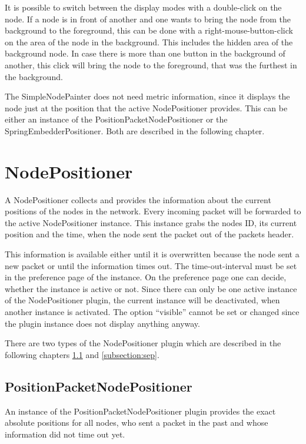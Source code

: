 It is possible to switch between the display modes with a double-click on the node. If a node is in front of another and one
wants to bring the node from the background to the foreground, this can be done with a right-mouse-button-click on
the area of the node in the background. This includes the hidden area of the background node.
In case there is more than one button in the background of another, this click will
bring the node to the foreground, that was the furthest in the background.

The SimpleNodePainter does not need metric information, since it displays the node just at the position that the active
NodePositioner provides. This can be either an instance of the PositionPacketNodePositioner or the SpringEmbedderPositioner.
Both are described in the following chapter.

\newpage
\section{NodePositioner}

A NodePositioner collects and provides the information about the current positions of the nodes in the network. Every incoming
packet will be forwarded to the active NodePositioner instance. This instance grabs the nodes ID, its current position and
the time, when the node sent the packet out of the packets header.

This information is available either until it is overwritten
because the node sent a new packet or until the information times out. The time-out-interval must be set in the preference page
of the instance. On the preference page one can decide, whether the instance is active or not. Since there can only be one
active instance of the NodePositioner plugin, the current instance will be deactivated, when another instance is activated.
The option ``visible'' cannot be set or changed since the plugin instance does not display anything anyway.

There are two types of the NodePositioner plugin which are described in the following chapters \ref{subsection:ppnp} and
\ref{subsection:sep}.

\subsection{PositionPacketNodePositioner}
\label{subsection:ppnp}

An instance of the PositionPacketNodePositioner plugin provides the exact absolute positions for all nodes, who sent
a packet in the past and whose information did not time out yet.

